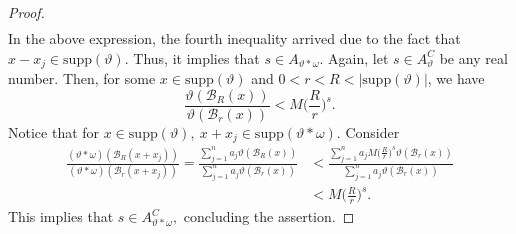 \documentclass{amsproc}
\theoremstyle{definition}
\theoremstyle{remark}
\numberwithin{equation}{section}
\begin{document}
\begin{proof}
\begin{equation*}
\begin{aligned}
    \end{aligned}
\end{equation*}
In the above expression, the fourth inequality arrived due to the fact that $ x-x_j \in \text{supp}(\vartheta).$ Thus, it implies that $s \in A_{\vartheta * \omega}.$
Again, let $s \in A_{\vartheta}^C$ be any real number. Then, for some $x \in \text{supp}(\vartheta)$ and $0< r< R< |\text{supp}(\vartheta)|$, we have 
$$  \frac{\vartheta(\mathcal{B}_R(x))}{\vartheta(\mathcal{B}_r(x))} < M\bigg(\frac{R}{r}\bigg)^s.$$
Notice that for $x \in \text{supp}(\vartheta),~ x +x_j \in \text{supp}(\vartheta * \omega).$ Consider 
\begin{equation*}
   \begin{aligned}
        \frac{(\vartheta * \omega)(\mathcal{B}_R(x+x_j))}{(\vartheta * \omega)(\mathcal{B}_r(x+x_j))} = \frac{\sum_{j=1}^n a_j \vartheta(\mathcal{B}_R(x))}{\sum_{j=1}^n a_j \vartheta( \mathcal{B}_r(x))} &< \frac{\sum_{j=1}^n a_j M \bigg(\frac{R}{r}\bigg)^s \vartheta(\mathcal{B}_r(x))}{\sum_{j=1}^n a_j \vartheta( \mathcal{B}_r(x))} \\& < M \bigg(\frac{R}{r}\bigg)^s.
   \end{aligned} 
\end{equation*}
This implies that $s \in A_{\vartheta *\omega}^C,$ concluding the assertion.
\end{proof}
\end{document}
